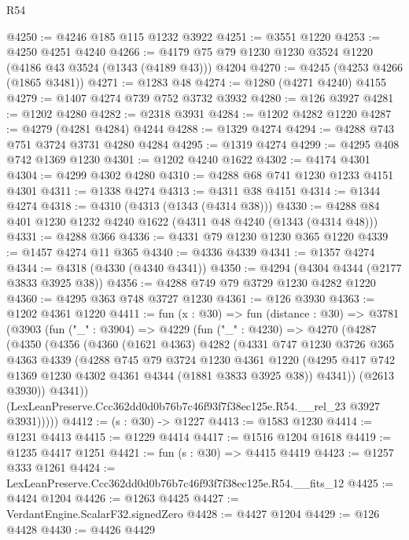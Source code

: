 \begin{lexlean}{R54}
\begin{coremodule}
@4250 := @4246 @185 @115 @1232 @3922
@4251 := @3551 @1220
@4253 := @4250 @4251 @4240
@4266 := @4179 @75 @79 @1230 @1230 @3524 @1220 (@4186 @43 @3524 (@1343 (@4189 @43))) @4204
@4270 := @4245 (@4253 @4266 (@1865 @3481))
@4271 := @1283 @48
@4274 := @1280 (@4271 @4240) @4155
@4279 := @1407 @4274 @739 @752 @3732 @3932
@4280 := @126 @3927
@4281 := @1202 @4280
@4282 := @2318 @3931
@4284 := @1202 @4282 @1220
@4287 := @4279 (@4281 @4284) @4244
@4288 := @1329 @4274
@4294 := @4288 @743 @751 @3724 @3731 @4280 @4284
@4295 := @1319 @4274
@4299 := @4295 @408 @742 @1369 @1230
@4301 := @1202 @4240 @1622
@4302 := @4174 @4301
@4304 := @4299 @4302 @4280
@4310 := @4288 @68 @741 @1230 @1233 @4151 @4301
@4311 := @1338 @4274
@4313 := @4311 @38 @4151
@4314 := @1344 @4274
@4318 := @4310 (@4313 (@1343 (@4314 @38)))
@4330 := @4288 @84 @401 @1230 @1232 @4240 @1622 (@4311 @48 @4240 (@1343 (@4314 @48)))
@4331 := @4288 @366
@4336 := @4331 @79 @1230 @1230 @365 @1220
@4339 := @1457 @4274 @11 @365
@4340 := @4336 @4339
@4341 := @1357 @4274
@4344 := @4318 (@4330 (@4340 @4341))
@4350 := @4294 (@4304 @4344 (@2177 @3833 @3925 @38))
@4356 := @4288 @749 @79 @3729 @1230 @4282 @1220
@4360 := @4295 @363 @748 @3727 @1230
@4361 := @126 @3930
@4363 := @1202 @4361 @1220
@4411 := fun (x : @30) =>
  fun (distance : @30) =>
  @3781
    (@3903
      (fun ("_" : @3904) =>
      @4229
        (fun ("_" : @4230) =>
        @4270
          (@4287
            (@4350
              (@4356
                (@4360
                  (@1621 @4363)
                  @4282
                  (@4331
                    @747
                    @1230
                    @3726
                    @365
                    @4363
                    @4339
                    (@4288
                      @745
                      @79
                      @3724
                      @1230
                      @4361
                      @1220
                      (@4295 @417 @742 @1369 @1230 @4302 @4361 @4344 (@1881 @3833 @3925 @38))
                      @4341))
                  (@2613 @3930))
                @4341))
            (LexLeanPreserve.Ccc362dd0d0b76b7c46f93f7f38ec125e.R54.__rel_23 @3927 @3931)))))
@4412 := (s : @30) -> @1227
@4413 := @1583 @1230
@4414 := @1231 @4413
@4415 := @1229 @4414
@4417 := @1516 @1204 @1618
@4419 := @1235 @4417 @1251
@4421 := fun (s : @30) => @4415 @4419
@4423 := @1257 @333 @1261
@4424 := LexLeanPreserve.Ccc362dd0d0b76b7c46f93f7f38ec125e.R54.__fits_12
@4425 := @4424 @1204
@4426 := @1263 @4425
@4427 := VerdantEngine.ScalarF32.signedZero
@4428 := @4427 @1204
@4429 := @126 @4428
@4430 := @4426 @4429

\end{coremodule}
\end{lexlean}
